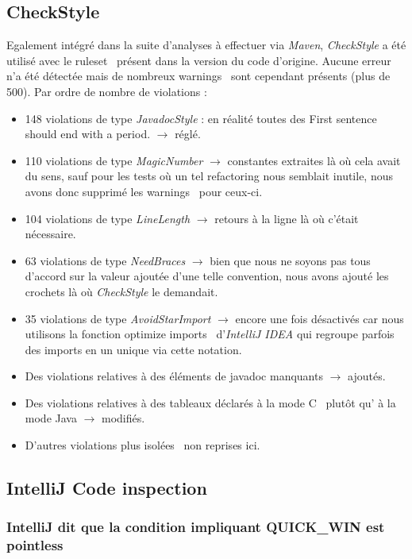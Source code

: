 \documentclass[12pt, openany]{report}
\begin{document}
\subsection{CheckStyle}
Egalement intégré dans la suite d'analyses à effectuer via \textit{Maven}, \textit{CheckStyle} a été utilisé avec le \og ruleset \fg \, présent dans la version du code d'origine.
Aucune erreur n'a été détectée mais de nombreux \og warnings \fg \, sont cependant présents (plus de 500). Par ordre de nombre de \og violations \fg :
\begin{itemize}
	\item 148 violations de type \textit{JavadocStyle} : en réalité toutes des \og First sentence should end with a period. \fg $\rightarrow$ réglé. 
	\item 110 violations de type \textit{MagicNumber} $\rightarrow$ constantes extraites là où cela avait du sens, sauf pour les tests où un tel refactoring nous semblait inutile, nous avons donc supprimé les \og warnings \fg \, pour ceux-ci.
	\item 104 violations de type \textit{LineLength} $\rightarrow$ retours à la ligne là où c'était nécessaire.
	\item 63 violations de type \textit{NeedBraces} $\rightarrow$ bien que nous ne soyons pas tous d'accord sur la valeur ajoutée d'une telle convention, nous avons ajouté les crochets là où \textit{CheckStyle} le demandait.
	\item 35 violations de type \textit{AvoidStarImport} $\rightarrow$ encore une fois désactivés car nous utilisons la fonction \og optimize imports \fg \, d'\textit{IntelliJ IDEA} qui regroupe parfois des imports en un unique via cette notation.
	\item Des violations relatives à des éléments de javadoc manquants $\rightarrow$ ajoutés.
	\item Des violations relatives à des tableaux déclarés à la \og mode C \fg \, plutôt qu' à la \og mode Java \fg $\rightarrow$ modifiés.
	\item D'autres violations plus \og isolées \fg \, non reprises ici.
\end{itemize}

\subsection{IntelliJ Code inspection}
\subsubsection{IntelliJ dit que la condition impliquant QUICK\_WIN est \og pointless \fg} 
\end{document}

